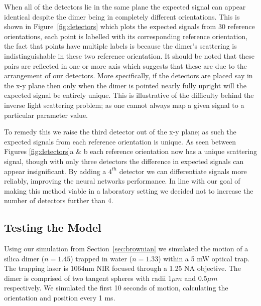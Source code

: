 When all of the detectors lie in the same plane the expected signal can appear identical despite the dimer being in completely different orientations. This is shown in Figure~\ref{fig:detectors} which plots the expected signals from 30 reference orientations, each point is labelled with its corresponding reference orientation, the fact that points have multiple labels is because the dimer's scattering is indistinguishable in these two reference orientation. It should be noted that these pairs are reflected in one or more axis which suggests that these are due to the arrangement of our detectors. More specifically, if the detectors are placed say in the x-y plane then only when the dimer is pointed nearly fully upright will the expected signal be entirely unique. This is illustrative of the difficulty behind the inverse light scattering problem; as one cannot always map a given signal to a particular parameter value.

To remedy this we raise the third detector out of the x-y plane; as such the expected signals from each reference orientation is unique. As seen between Figures \ref{fig:detectors}a \& b each reference orientation now has a unique scattering signal, though with only three detectors the difference in expected signals can appear insignificant. By adding a $4^{th}$ detector we can differentiate signals more reliably, improving the neural networks performance.   In line with our goal of making this method viable in a laboratory setting we decided not to increase the number of detectors further than 4. 

\subsection{Testing the Model}
\label{sec:test}
Using our simulation from Section~\ref{sec:brownian} we simulated the motion of a silica dimer ($n = 1.45$) trapped in water ($n = 1.33$) within a 5 mW optical trap. The trapping laser is 1064nm NIR focused through a 1.25 NA objective. The dimer is comprised of two tangent spheres with radii $1 \mu m$ and $0.5 \mu m$ respectively. We simulated the first 10 seconds of motion, calculating the orientation and position every 1 ms. 

